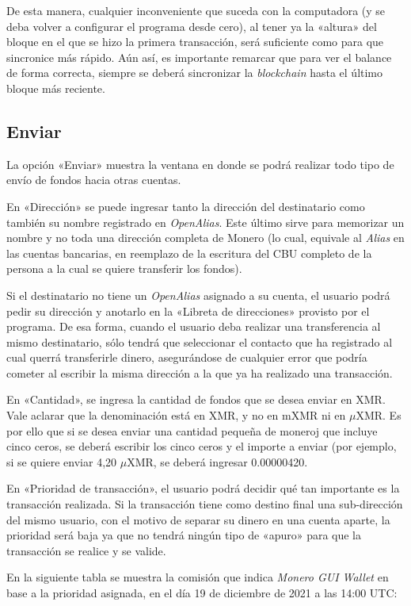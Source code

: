 \documentclass[12pt,a4paper,twoside]{book}
\begin{document}
De esta manera, cualquier inconveniente que suceda con la computadora (y se deba volver a configurar el programa desde cero), al tener ya la «altura» del bloque en el que se hizo la primera transacción, será suficiente como para que sincronice más rápido. Aún así, es importante remarcar que para ver el balance de forma correcta, siempre se deberá sincronizar la \textit{blockchain} hasta el último bloque más reciente.

\subsection{Enviar}
La opción «Enviar» muestra la ventana en donde se podrá realizar todo tipo de envío de fondos hacia otras cuentas.

En «Dirección» se puede ingresar tanto la dirección del destinatario como también su nombre registrado en \textit{OpenAlias}. Este último sirve para memorizar un nombre y no toda una dirección completa de Monero (lo cual, equivale al \textit{Alias} en las cuentas bancarias, en reemplazo de la escritura del CBU completo de la persona a la cual se quiere transferir los fondos).

Si el destinatario no tiene un \textit{OpenAlias} asignado a su cuenta, el usuario podrá pedir su dirección y anotarlo en la «Libreta de direcciones» provisto por el programa. De esa forma, cuando el usuario deba realizar una transferencia al mismo destinatario, sólo tendrá que  seleccionar el contacto que ha registrado al cual querrá transferirle dinero, asegurándose de cualquier error que podría cometer al escribir la misma dirección a la que ya ha realizado una transacción.

En «Cantidad», se ingresa la cantidad de fondos que se desea enviar en XMR. Vale aclarar que la denominación está en XMR, y no en mXMR ni en $ \mu $XMR. Es por ello que si se desea enviar una cantidad pequeña de moneroj que incluye cinco ceros, se deberá escribir los cinco ceros y el importe a enviar (por ejemplo, si se quiere enviar 4,20 $ \mu $XMR, se deberá ingresar 0.00000420.

En «Prioridad de transacción», el usuario podrá decidir qué tan importante es la transacción realizada. Si la transacción tiene como destino final una sub-dirección del mismo usuario, con el motivo de separar su dinero en una cuenta aparte, la prioridad será baja ya que no tendrá ningún tipo de «apuro» para que la transacción se realice y se valide.

En la siguiente tabla se muestra la comisión que indica \textit{Monero GUI Wallet} en base a la prioridad asignada, en el día 19 de diciembre de 2021 a las 14:00 UTC:
\end{document}
